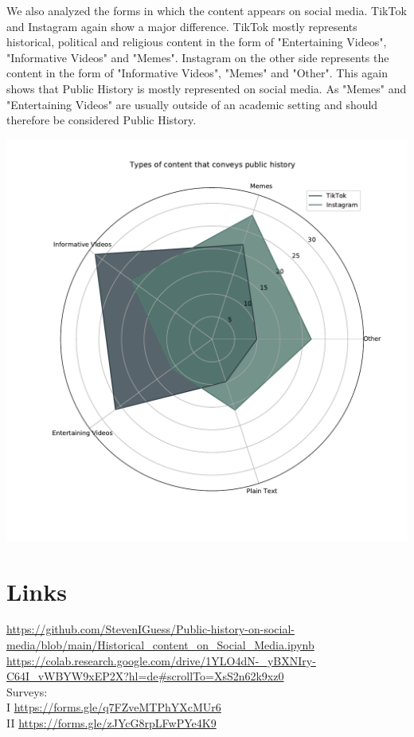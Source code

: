 \documentclass{article}
\begin{document}
We also analyzed the forms in which the content appears on social media. TikTok and Instagram again show a major difference. TikTok mostly represents historical, political and religious content in the form of "Entertaining Videos", "Informative Videos" and "Memes". Instagram on the other side represents the content in the form of  "Informative Videos", "Memes" and "Other". This again shows that Public History is mostly represented on social media. As "Memes" and "Entertaining Videos" are usually outside of an academic setting and should therefore be considered Public History.


\begin{center}

\includegraphics[scale = 0.6]{TypesOfContnent.pdf}

\end{center}

\newpage

\section{Links}
 

\url{https://github.com/StevenIGuess/Public-history-on-social-media/blob/main/Historical_content_on_Social_Media.ipynb}\\

\url{https://colab.research.google.com/drive/1YLO4dN-_yBXNIry-C64I_vWBYW9xEP2X?hl=de#scrollTo=XsS2n62k9xz0}\\

Surveys: \\

I \url{https://forms.gle/q7FZveMTPhYXcMUr6}\\

II \url{https://forms.gle/zJYcG8rpLFwPYe4K9}\\
\end{document}
